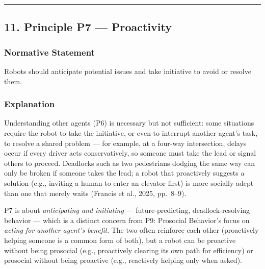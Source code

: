 \documentclass[utf8]{frontiers_suppmat} %
\begin{document}
\begin{center}\rule{0.5\linewidth}{0.5pt}\end{center}

\subsection{11. Principle P7 ---
Proactivity}\label{principle-p7-proactivity}

\subsubsection{Normative Statement}\label{normative-statement-7}

Robots should anticipate potential issues and take initiative to avoid
or resolve them.

\subsubsection{Explanation}\label{explanation-7}

Understanding other agents (P6) is necessary but not sufficient: some
situations require the robot to take the initiative, or even to
interrupt another agent's task, to resolve a shared problem --- for
example, at a four-way intersection, delays occur if every driver acts
conservatively, so someone must take the lead or signal others to
proceed. Deadlocks such as two pedestrians dodging the same way can only
be broken if someone takes the lead; a robot that proactively suggests a
solution (e.g., inviting a human to enter an elevator first) is more
socially adept than one that merely waits (Francis et al., 2025,
pp.~8--9).

P7 is about \emph{anticipating and initiating} --- future-predicting,
deadlock-resolving behavior --- which is a distinct concern from P9:
Prosocial Behavior's focus on \emph{acting for another agent's benefit}.
The two often reinforce each other (proactively helping someone is a
common form of both), but a robot can be proactive without being
prosocial (e.g., proactively clearing its own path for efficiency) or
prosocial without being proactive (e.g., reactively helping only when
asked).
\end{document}
